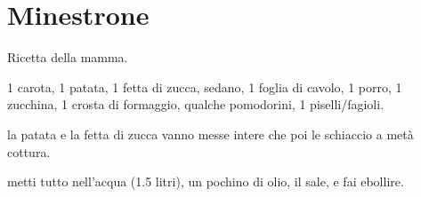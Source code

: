 \section{Minestrone}

Ricetta della mamma.
\generalRecipeInfos{}

1 carota, 1 patata, 1 fetta di zucca, sedano, 1 foglia di cavolo, 1 porro, 1 zucchina, 1 crosta di formaggio, qualche pomodorini, 1 piselli/fagioli.

la patata e la fetta di zucca vanno messe intere che poi le schiaccio a metà cottura.

metti tutto nell'acqua (1.5 litri), un pochino di olio, il sale, e fai ebollire.